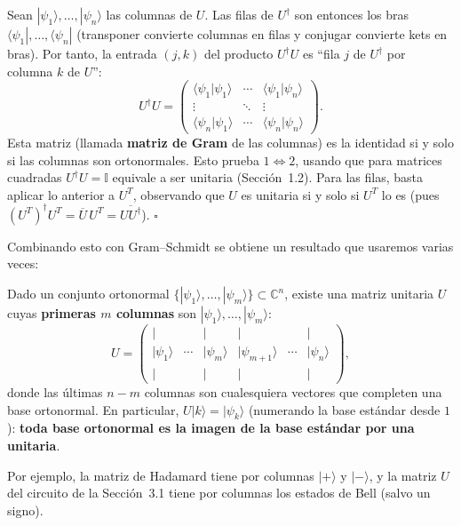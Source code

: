\documentclass[11pt, a4paper, twoside, openright]{report}
\begin{document}
\begin{tcolorbox}[colback=gray!5!white,colframe=gray!75!black,title=\textbf{Demostración}]
Sean $|\psi_1\rangle,\dots,|\psi_n\rangle$ las columnas de $U$. Las filas de $U^\dagger$ son entonces los bras $\langle\psi_1|,\dots,\langle\psi_n|$ (transponer convierte columnas en filas y conjugar convierte kets en bras). Por tanto, la entrada $(j,k)$ del producto $U^\dagger U$ es ``fila $j$ de $U^\dagger$ por columna $k$ de $U$'':
\[ U^\dagger U = \begin{pmatrix}
\langle\psi_1|\psi_1\rangle & \cdots & \langle\psi_1|\psi_n\rangle\\
\vdots & \ddots & \vdots\\
\langle\psi_n|\psi_1\rangle & \cdots & \langle\psi_n|\psi_n\rangle
\end{pmatrix}. \]
Esta matriz (llamada \textbf{matriz de Gram} de las columnas) es la identidad si y solo si las columnas son ortonormales. Esto prueba $1\iff2$, usando que para matrices cuadradas $U^\dagger U = \mathbb{I}$ equivale a ser unitaria (Sección~1.2). Para las filas, basta aplicar lo anterior a $U^T$, observando que $U$ es unitaria si y solo si $U^T$ lo es (pues $(U^T)^\dagger U^T = \overline{U}\,U^T = \overline{UU^\dagger}$). \hfill $\square$
\end{tcolorbox}

\noindent Combinando esto con Gram--Schmidt se obtiene un resultado que usaremos varias veces:

\begin{tcolorbox}[colback=teal!5!white,colframe=teal!75!black,title=\textbf{Corolario}]
Dado un conjunto ortonormal $\{|\psi_1\rangle,\dots,|\psi_m\rangle\}\subset\mathbb{C}^n$, existe una matriz unitaria $U$ cuyas \textbf{primeras $m$ columnas} son $|\psi_1\rangle,\dots,|\psi_m\rangle$:
\[ U = \begin{pmatrix} | & & | & | & & | \\ |\psi_1\rangle & \cdots & |\psi_m\rangle & |\psi_{m+1}\rangle & \cdots & |\psi_n\rangle \\ | & & | & | & & | \end{pmatrix}, \]
donde las últimas $n-m$ columnas son cualesquiera vectores que completen una base ortonormal. En particular, $U|k\rangle = |\psi_{k}\rangle$ (numerando la base estándar desde $1$): \textbf{toda base ortonormal es la imagen de la base estándar por una unitaria}.
\end{tcolorbox}

\noindent Por ejemplo, la matriz de Hadamard tiene por columnas $|+\rangle$ y $|-\rangle$, y la matriz $U$ del circuito de la Sección~3.1 tiene por columnas los estados de Bell (salvo un signo).
\end{document}
